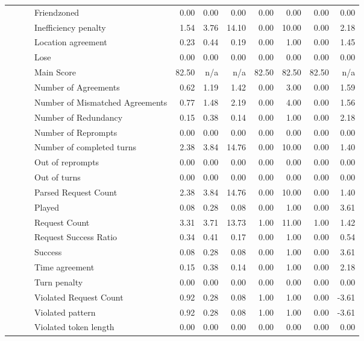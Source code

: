 \begin{tabular}{llllrrrrrrr}
 &  &  & Friendzoned & 0.00 & 0.00 & 0.00 & 0.00 & 0.00 & 0.00 & 0.00 \\
 &  &  & Inefficiency penalty & 1.54 & 3.76 & 14.10 & 0.00 & 10.00 & 0.00 & 2.18 \\
 &  &  & Location agreement & 0.23 & 0.44 & 0.19 & 0.00 & 1.00 & 0.00 & 1.45 \\
 &  &  & Lose & 0.00 & 0.00 & 0.00 & 0.00 & 0.00 & 0.00 & 0.00 \\
 &  &  & Main Score & 82.50 & n/a & n/a & 82.50 & 82.50 & 82.50 & n/a \\
 &  &  & Number of Agreements & 0.62 & 1.19 & 1.42 & 0.00 & 3.00 & 0.00 & 1.59 \\
 &  &  & Number of Mismatched Agreements & 0.77 & 1.48 & 2.19 & 0.00 & 4.00 & 0.00 & 1.56 \\
 &  &  & Number of Redundancy & 0.15 & 0.38 & 0.14 & 0.00 & 1.00 & 0.00 & 2.18 \\
 &  &  & Number of Reprompts & 0.00 & 0.00 & 0.00 & 0.00 & 0.00 & 0.00 & 0.00 \\
 &  &  & Number of completed turns & 2.38 & 3.84 & 14.76 & 0.00 & 10.00 & 0.00 & 1.40 \\
 &  &  & Out of reprompts & 0.00 & 0.00 & 0.00 & 0.00 & 0.00 & 0.00 & 0.00 \\
 &  &  & Out of turns & 0.00 & 0.00 & 0.00 & 0.00 & 0.00 & 0.00 & 0.00 \\
 &  &  & Parsed Request Count & 2.38 & 3.84 & 14.76 & 0.00 & 10.00 & 0.00 & 1.40 \\
 &  &  & Played & 0.08 & 0.28 & 0.08 & 0.00 & 1.00 & 0.00 & 3.61 \\
 &  &  & Request Count & 3.31 & 3.71 & 13.73 & 1.00 & 11.00 & 1.00 & 1.42 \\
 &  &  & Request Success Ratio & 0.34 & 0.41 & 0.17 & 0.00 & 1.00 & 0.00 & 0.54 \\
 &  &  & Success & 0.08 & 0.28 & 0.08 & 0.00 & 1.00 & 0.00 & 3.61 \\
 &  &  & Time agreement & 0.15 & 0.38 & 0.14 & 0.00 & 1.00 & 0.00 & 2.18 \\
 &  &  & Turn penalty & 0.00 & 0.00 & 0.00 & 0.00 & 0.00 & 0.00 & 0.00 \\
 &  &  & Violated Request Count & 0.92 & 0.28 & 0.08 & 1.00 & 1.00 & 0.00 & -3.61 \\
 &  &  & Violated pattern & 0.92 & 0.28 & 0.08 & 1.00 & 1.00 & 0.00 & -3.61 \\
 &  &  & Violated token length & 0.00 & 0.00 & 0.00 & 0.00 & 0.00 & 0.00 & 0.00 \\

\end{tabular}
